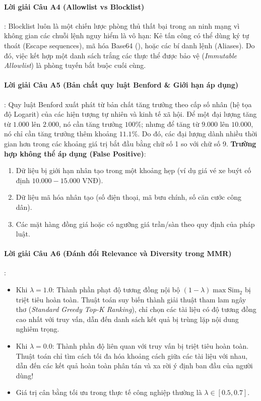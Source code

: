 \paragraph{Lời giải Câu A4 (Allowlist vs Blocklist)}:
Blocklist luôn là một chiến lược phòng thủ thất bại trong an ninh mạng vì không gian các chuỗi lệnh nguy hiểm là vô hạn: Kẻ tấn công có thể dùng ký tự thoát (Escape sequences), mã hóa Base64 (), hoặc các bí danh lệnh (Aliases). Do đó, việc kết hợp một danh sách trắng các thực thể được bảo vệ (\textit{Immutable Allowlist}) là phòng tuyến bắt buộc cuối cùng.

\paragraph{Lời giải Câu A5 (Bản chất quy luật Benford \& Giới hạn áp dụng)}:
Quy luật Benford xuất phát từ bản chất tăng trưởng theo cấp số nhân (hệ tọa độ Logarit) của các hiện tượng tự nhiên và kinh tế xã hội. Để một đại lượng tăng từ $1.000$ lên $2.000$, nó cần tăng trưởng $100\%$; nhưng để tăng từ $9.000$ lên $10.000$, nó chỉ cần tăng trưởng thêm khoảng $11.1\%$. Do đó, các đại lượng dành nhiều thời gian hơn trong các khoảng giá trị bắt đầu bằng chữ số 1 so với chữ số 9.
\textbf{Trường hợp không thể áp dụng (False Positive)}:
\begin{enumerate}
  \item Dữ liệu bị giới hạn nhân tạo trong một khoảng hẹp (ví dụ giá vé xe buýt cố định $10.000 - 15.000\text{ VNĐ}$).
  \item Dữ liệu mã hóa nhân tạo (số điện thoại, mã bưu chính, số căn cước công dân).
  \item Các mặt hàng đồng giá hoặc có ngưỡng giá trần/sàn theo quy định của pháp luật.
\end{enumerate}

\paragraph{Lời giải Câu A6 (Đánh đổi Relevance và Diversity trong MMR)}:
\begin{itemize}
  \item Khi $\lambda = 1.0$: Thành phần phạt độ tương đồng nội bộ $(1 - \lambda)\max \text{Sim}_2$ bị triệt tiêu hoàn toàn. Thuật toán suy biến thành giải thuật tham lam ngây thơ (\textit{Standard Greedy Top-K Ranking}), chỉ chọn các tài liệu có độ tương đồng cao nhất với truy vấn, dẫn đến danh sách kết quả bị trùng lặp nội dung nghiêm trọng.
  \item Khi $\lambda = 0.0$: Thành phần độ liên quan với truy vấn bị triệt tiêu hoàn toàn. Thuật toán chỉ tìm cách tối đa hóa khoảng cách giữa các tài liệu với nhau, dẫn đến các kết quả hoàn toàn phân tán và xa rời ý định ban đầu của người dùng!
  \item Giá trị cân bằng tối ưu trong thực tế công nghiệp thường là $\lambda \in [0.5, 0.7]$.
\end{itemize}

